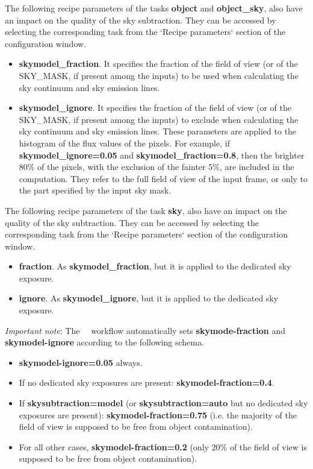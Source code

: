 The following recipe parameters of the tasks {\bf object} and
{\bf object\_sky}, also have an impact on the quality of the sky
subtraction. They can be accessed by selecting the corresponding task
from the `Recipe parameters` section of the configuration window.
\begin{itemize}
  
\item {\bf skymodel\_fraction}. It specifies the fraction of the field of
  view (or of the SKY\_MASK, if present among the inputs) to be used
  when calculating the sky continuum and sky emission lines.

\item {\bf skymodel\_ignore}. It specifies the fraction of the field
  of view (or of the SKY\_MASK, if present among the inputs) to
  exclude when calculating the sky continuum and sky emission lines.
  These parameters are applied to the histogram of the flux values of
  the pixels. For example, if {\bf skymodel\_ignore=0.05} and
  {\bf skymodel\_fraction=0.8}, then the brighter 80\% of the pixels,
  with the exclusion of the fainter 5\%, are included in the
  computation. They refer to the full field of view of the input
  frame, or only to the part specified by the input sky mask.
\end{itemize}

The following recipe parameters of the task {\bf sky}, also have an
impact on the quality of the sky subtraction. They can be accessed by
selecting the corresponding task from the `Recipe parameters` section
of the configuration window.

\begin{itemize}

\item {\bf fraction}. As {\bf skymodel\_fraction}, but it is applied to the
  dedicated sky exposure.

\item {\bf ignore}. As {\bf skymodel\_ignore}, but it is applied to the
  dedicated sky exposure.
  
\end{itemize}

{\it Important note}: The \instname\ \edps\ workflow automatically
sets {\bf skymode-fraction} and {\bf skymodel-ignore} according to the
following schema.

\begin{itemize}
\item {\bf skymodel-ignore=0.05} always.

\item If no dedicated sky exposures are present: {\bf skymodel-fraction=0.4}.

\item If {\bf skysubtraction=model} (or {\bf skysubtraction=auto} but
  no dedicated sky exposures are present): {\bf
    skymodel-fraction=0.75} (i.e. the majority of the field of view is
  supposed to be free from object contamination).

\item For all other cases, {\bf skymodel-fraction=0.2} (only 20\% of
  the field of view is supposed to be free from object contamination).
\end{itemize}

